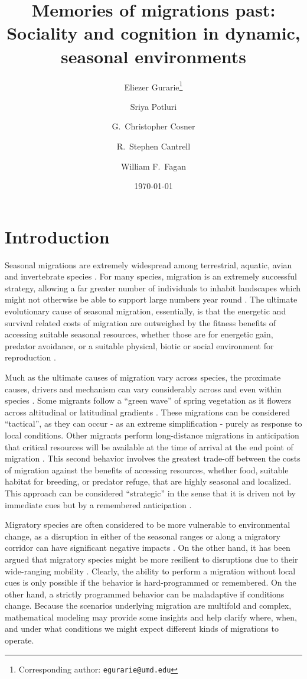 \documentclass[12pt]{article}
\title{Memories of migrations past: Sociality and cognition in dynamic,
seasonal environments}
\author[a,b]{Eliezer Gurarie\footnote{Corresponding author: \texttt{egurarie@umd.edu}}}
\author[a]{Sriya Potluri}
\author[c]{G.~Christopher Cosner}
\author[c]{R.~Stephen Cantrell}
\author[a,b]{William F.~Fagan}
\affil[a]{\,\, Department of Biology, University of Maryland, College Park, MD 20742, USA.}
\affil[b]{\,\,Socio-Economic Synthesis Center, SESYNC, Annapolis, MD, USA.}
\affil[c]{\,\,Department of Mathematics, The University of Miami, Coral Gables, FL 33146}
\date{\today}
\begin{document}
\onehalfspacing

\maketitle


\abstract



\section{Introduction}

Seasonal migrations are extremely widespread among terrestrial, aquatic, avian and invertebrate species \citep{Dingle2014}. For many species, migration is an extremely successful strategy, allowing a far greater number of individuals to inhabit landscapes which might not otherwise be able to support large numbers year round \citep{Fryxell1988}. The ultimate evolutionary cause of seasonal migration, essentially, is that the energetic and survival related costs of migration are outweighed by the fitness benefits of accessing suitable seasonal resources, whether those are for energetic gain, predator avoidance, or a suitable physical, biotic or social environment for reproduction \citep{Avgar2014}.

Much as the ultimate causes of migration vary across species, the proximate causes, drivers and mechanism can vary considerably across and even within species \citep{Berthold1999, Shaw2016}. Some migrants follow a ``green wave'' of spring vegetation as it flowers across altitudinal or latitudinal gradients \citep{Bischof2012, Kolzsch2015}. These migrations can be considered ``tactical'', as they can occur - as an extreme simplification - purely as response to local conditions. Other migrants perform long-distance migrations in anticipation that critical resources will be available at the time of arrival at the end point of migration \citep{Abrahms2019}. This second behavior involves the greatest trade-off between the costs of migration against the benefits of accessing resources, whether food, suitable habitat for breeding, or predator refuge, that are highly seasonal and localized. This approach can be considered ``strategic'' in the sense that it is driven not by immediate cues but by a remembered anticipation \citep{Bracis2017}.

Migratory species are often considered to be more vulnerable to environmental change, as a disruption in either of the seasonal ranges or along a migratory corridor can have significant negative impacts \citep{Wilcove2008, Kauffman2021}. On the other hand, it has been argued that migratory species might be more resilient to disruptions due to their wide-ranging mobility \citep{Robinson2009}. Clearly, the ability to perform a migration without local cues is only possible if the behavior is hard-programmed or remembered. On the other hand, a strictly programmed behavior can be maladaptive if conditions change. Because the scenarios underlying migration are multifold and complex, mathematical modeling may provide some insights and help clarify where, when, and under what conditions we might expect different kinds of migrations to operate.
\end{document}
